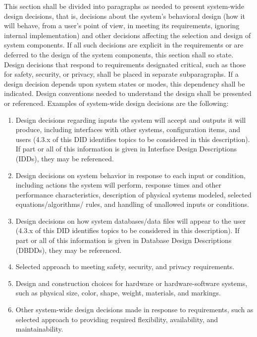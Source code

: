 \documentclass{fidata-report-template}
\begin{document}
This section shall be divided into paragraphs as needed to present
system-wide design decisions, that is, decisions about the system's
behavioral design (how it will behave, from a user's point of view, in
meeting its requirements, ignoring internal implementation) and other
decisions affecting the selection and design of system components. If
all such decisions are explicit in the requirements or are deferred to
the design of the system components, this section shall so state. Design
decisions that respond to requirements designated critical, such as
those for safety, security, or privacy, shall be placed in separate
subparagraphs. If a design decision depends upon system states or modes,
this dependency shall be indicated. Design conventions needed to
understand the design shall be presented or referenced. Examples of
system-wide design decisions are the following:

\begin{enumerate}
\itemsep1pt\parskip0pt
\item
  Design decisions regarding inputs the system will accept and outputs
  it will produce, including interfaces with other systems,
  configuration items, and users (4.3.x of this DID identifies topics to
  be considered in this description). If part or all of this information
  is given in Interface Design Descriptions (IDDs), they may be
  referenced.
\item
  Design decisions on system behavior in response to each input or
  condition, including actions the system will perform, response times
  and other performance characteristics, description of physical systems
  modeled, selected equations/algorithms/ rules, and handling of
  unallowed inputs or conditions.
\item
  Design decisions on how system databases/data files will appear to the
  user (4.3.x of this DID identifies topics to be considered in this
  description). If part or all of this information is given in Database
  Design Descriptions (DBDDs), they may be referenced.
\item
  Selected approach to meeting safety, security, and privacy
  requirements.
\item
  Design and construction choices for hardware or hardware-software
  systems, such as physical size, color, shape, weight, materials, and
  markings.
\item
  Other system-wide design decisions made in response to requirements,
  such as selected approach to providing required flexibility,
  availability, and maintainability.
\end{enumerate}
\end{document}
